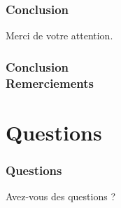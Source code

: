 \documentclass{beamer}
\begin{document}
\begin{frame}
    \frametitle{Conclusion}
    \begin{block}{}
        \centering
        Merci de votre attention.
    \end{block}
\end{frame}

\begin{frame}
    \frametitle{Conclusion \\
                \small Remerciements}      
    \begin{block}{}
        
    \end{block}         
\end{frame}

\section*{Questions}

\begin{frame}
    \frametitle{Questions}
    \begin{block}{}
        \centering
        Avez-vous des questions ?
    \end{block}
\end{frame}
\end{document}
